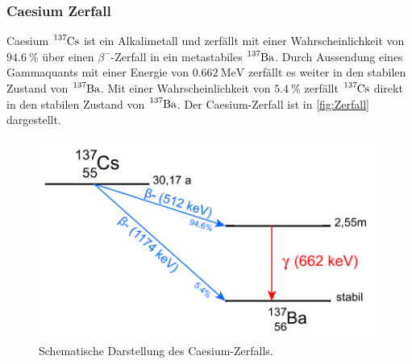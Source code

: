 \subsubsection{Caesium Zerfall}
\label{subsubsec:Caesium}
Caesium $\ce{^{137}Cs}$ ist ein Alkalimetall und zerfällt mit einer Wahrscheinlichkeit von $\qty{94.6}{\percent}$ über einen $\beta^-$-Zerfall
in ein metastabiles $\ce{^{137}Ba}$.
Durch Aussendung eines Gammaquants mit einer Energie von $\qty{0.662}{\mega\eV}$ zerfällt es weiter in den stabilen Zustand von $\ce{^{137}Ba}$.
Mit einer Wahrscheinlichkeit von $\qty{5.4}{\percent}$ zerfällt $\ce{^{137}Cs}$ direkt in den stabilen Zustand von $\ce{^{137}Ba}$.
Der Caesium-Zerfall ist in \autoref{fig:Zerfall} dargestellt.
\begin{figure}[H]
    \centering
    \includegraphics[scale=0.7]{Abbildungen/Caesiumzerfall.png}
    \caption{Schematische Darstellung des Caesium-Zerfalls.\cite{Gammaspektrum}}
    \label{fig:Zerfall}
\end{figure}



